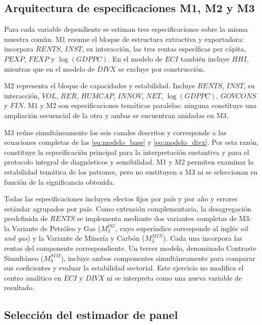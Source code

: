 \documentclass[../../TFM.tex]{subfiles}
\begin{document}
	\subsection{Arquitectura de especificaciones M1, M2 y M3}
	\label{subsec:arquitectura-modelos}

	Para cada variable dependiente se estiman tres especificaciones sobre la misma
	muestra común. M1 resume el bloque de estructura extractiva y exportadora:
	incorpora $RENTS$, $INST$, su interacción, las tres rentas específicas per
	cápita, $PEXP$, $FEXP$ y $\log(GDPPC)$. En el modelo de $ECI$ también incluye
	$HHI$, mientras que en el modelo de $DIVX$ se excluye por construcción.

	M2 representa el bloque de capacidades y estabilidad. Incluye $RENTS$,
	$INST$, su interacción, $VOL$, $RER$, $HUMCAP$, $INNOV$, $NET$,
	$\log(GDPPC)$, $GOVCONS$ y $FIN$. M1 y M2 son especificaciones temáticas
	paralelas: ninguna constituye una ampliación secuencial de la otra y ambas se
	encuentran anidadas en M3.

	M3 reúne simultáneamente los seis canales descritos y corresponde a las
	ecuaciones completas de las \autoref{eq:modelo_base} y
	\autoref{eq:modelo_divx}. Por esta razón, constituye la especificación
	principal para la interpretación sustantiva y para el protocolo integral de
	diagnósticos y sensibilidad. M1 y M2 permiten examinar la estabilidad temática
	de los patrones, pero no sustituyen a M3 ni se seleccionan en función de la
	significancia obtenida.

	Todas las especificaciones incluyen efectos fijos por país y por año y
	errores estándar agrupados por país. Como extensión complementaria, la
	desagregación predefinida de $RENTS$ se implementa mediante dos variantes
	completas de M3: la Variante de Petróleo y Gas ($M_{3}^{OG}$, cuyo
	superíndice corresponde al inglés \textit{oil and gas}) y la Variante de
	Minería y Carbón ($M_{3}^{MIN}$). Cada una incorpora las rentas del componente correspondiente. Un tercer modelo, denominado Contraste Simultáneo ($M_{3}^{SIM}$), incluye ambos
	componentes simultáneamente para comparar sus coeficientes y evaluar la
	estabilidad sectorial. Este ejercicio no modifica el centro analítico en $ECI$
	y $DIVX$ ni se interpreta como una nueva variable de resultado.

	\subsection{Selección del estimador de panel}
	\label{subsec:seleccion-estimador-panel}
\end{document}

